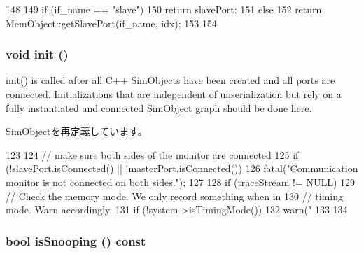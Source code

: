 \begin{DoxyCode}
148 {
149     if (if_name == "slave") {
150         return slavePort;
151     } else {
152         return MemObject::getSlavePort(if_name, idx);
153     }
154 }
\end{DoxyCode}
\hypertarget{classCommMonitor_a02fd73d861ef2e4aabb38c0c9ff82947}{
\subsubsection[{init}]{\setlength{\rightskip}{0pt plus 5cm}void init ()}}
\label{classCommMonitor_a02fd73d861ef2e4aabb38c0c9ff82947}
\hyperlink{classCommMonitor_a02fd73d861ef2e4aabb38c0c9ff82947}{init()} is called after all C++ SimObjects have been created and all ports are connected. Initializations that are independent of unserialization but rely on a fully instantiated and connected \hyperlink{classSimObject}{SimObject} graph should be done here. 

\hyperlink{classSimObject_a02fd73d861ef2e4aabb38c0c9ff82947}{SimObject}を再定義しています。


\begin{DoxyCode}
123 {
124     // make sure both sides of the monitor are connected
125     if (!slavePort.isConnected() || !masterPort.isConnected())
126         fatal("Communication monitor is not connected on both sides.\n");
127 
128     if (traceStream != NULL) {
129         // Check the memory mode. We only record something when in
130         // timing mode. Warn accordingly.
131         if (!system->isTimingMode())
132             warn("%
133     }
134 }
\end{DoxyCode}
\hypertarget{classCommMonitor_a5ce11b7a254d3cb756d94568f7cbc25d}{
\subsubsection[{isSnooping}]{\setlength{\rightskip}{0pt plus 5cm}bool isSnooping () const}}
\label{classCommMonitor_a5ce11b7a254d3cb756d94568f7cbc25d}



